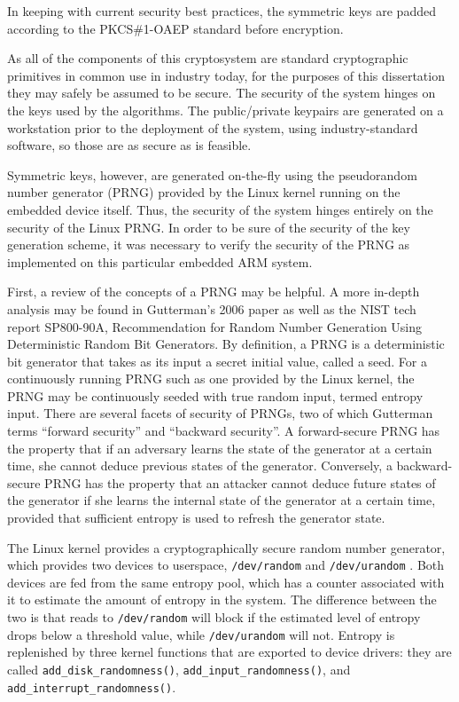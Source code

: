 In keeping with current security best practices, the symmetric keys are padded according to the PKCS\#1-OAEP standard before encryption\cite{Bellare1995}.


As all of the components of this cryptosystem are standard cryptographic primitives in common use in industry today, for the purposes of this
dissertation they may safely be assumed to be secure. The security of the system hinges on the keys used by the algorithms. The public/private
keypairs are generated on a workstation prior to the deployment of the system, using industry-standard software, so those are as secure
as is feasible.

Symmetric keys, however, are generated on-the-fly using the pseudorandom number generator (PRNG) provided by the Linux kernel running
on the embedded device itself. Thus, the security of the system hinges entirely on the security of the Linux PRNG. In order to be sure of
the security of the key generation scheme, it was necessary to verify the security of the PRNG as implemented on this particular embedded ARM
system.

First, a review of the concepts of a PRNG may be helpful. A more in-depth analysis may be found in Gutterman's 2006 paper\cite{Gutterman2006}
as well as the NIST tech report SP800-90A, Recommendation for Random Number Generation Using Deterministic Random Bit Generators\cite{NISTSP80090A}.
By definition, a PRNG is a deterministic bit generator that takes as its input a secret initial value, called a seed\cite{NISTSP80090A}.
For a continuously running PRNG such as one provided by the Linux kernel, the PRNG may be continuously seeded with true random input, termed entropy input.
There are several facets of security of PRNGs, two of which Gutterman terms ``forward security'' and ``backward security''\cite{Gutterman2006}.
A forward-secure PRNG has the property that if an adversary learns the state of the generator at a certain time, she cannot deduce previous
states of the generator. Conversely, a backward-secure PRNG has the property that an attacker cannot deduce future states of the generator
if she learns the internal state of the generator at a certain time, provided that sufficient entropy is used to refresh the generator state.

The Linux kernel provides a cryptographically secure random number generator, which provides two devices to userspace, \texttt{/dev/random} and
\texttt{/dev/urandom}\cite{goichon2012} .  Both devices are fed from the same entropy pool, which has a counter associated with it to estimate the amount of
entropy in the system. The difference between the two is that reads to \texttt{/dev/random} will block if the estimated level of entropy drops below
a threshold value, while \texttt{/dev/urandom} will not. Entropy is replenished by three kernel functions that are exported to device drivers: they are called
\texttt{add\_disk\_randomness()}, \texttt{add\_input\_randomness()}, and \texttt{add\_interrupt\_randomness()}.

